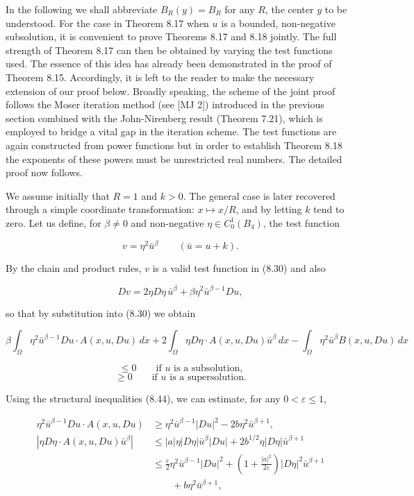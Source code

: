 In the following we shall abbreviate $B_R(y)=B_R$ for any $R$, the center $y$ to be understood. For the case in Theorem 8.17 when $u$ is a bounded, non-negative subsolution, it is convenient to prove Theorems 8.17 and 8.18 jointly. The full strength of Theorem 8.17 can then be obtained by varying the test functions used. The essence of this idea has already been demonstrated in the proof of Theorem 8.15. Accordingly, it is left to the reader to make the necessary extension of our proof below. Broadly speaking, the scheme of the joint proof follows the Moser iteration method (see [MJ 2]) introduced in the previous section combined with the John-Nirenberg result (Theorem 7.21), which is employed to bridge a vital gap in the iteration scheme. The test functions are again constructed from power functions but in order to establish Theorem 8.18 the exponents of these powers must be unrestricted real numbers. The detailed proof now follows.

We assume initially that $R=1$ and $k>0$. The general case is later recovered through a simple coordinate transformation: $x \mapsto x/R$, and by letting $k$ tend to zero. Let us define, for $\beta\neq 0$ and non-negative $\eta\in C_0^1(B_4)$, the test function

\begin{equation}\tag{8.48}
v=\eta^2\bar u^\beta \qquad (\bar u=u+k).
\end{equation}

By the chain and product rules, $v$ is a valid test function in (8.30) and also

\begin{equation}\tag{8.49}
Dv=2\eta D\eta\,\bar u^\beta+\beta\eta^2\bar u^{\beta-1}Du,
\end{equation}

so that by substitution into (8.30) we obtain

\begin{equation}\tag{8.50}
\beta\int_{\Omega}\eta^2\bar u^{\beta-1}Du\cdot A(x,u,Du)\,dx
+2\int_{\Omega}\eta D\eta\cdot A(x,u,Du)\bar u^\beta\,dx
-\int_{\Omega}\eta^2\bar u^\beta B(x,u,Du)\,dx
\end{equation}

\[
\le 0 \qquad \text{if }u\text{ is a subsolution,}
\]
\[
\ge 0 \qquad \text{if }u\text{ is a supersolution.}
\]

Using the structural inequalities (8.44), we can estimate, for any $0<\varepsilon\le 1$,

\begin{align}
\eta^2\bar u^{\beta-1}Du\cdot A(x,u,Du) &\ge \eta^2\bar u^{\beta-1}|Du|^2-2b\eta^2\bar u^{\beta+1},\\
|\eta D\eta\cdot A(x,u,Du)\bar u^\beta|
&\le |a|\eta |D\eta|\bar u^\beta|Du|+2b^{1/2}\eta|D\eta|\bar u^{\beta+1}\nonumber\\
&\le \frac{\varepsilon}{2}\eta^2\bar u^{\beta-1}|Du|^2+\left(1+\frac{|a|^2}{2\varepsilon}\right)|D\eta|^2\bar u^{\beta+1}\nonumber\\
&\qquad +b\eta^2\bar u^{\beta+1},\tag{8.51}
\end{align}

